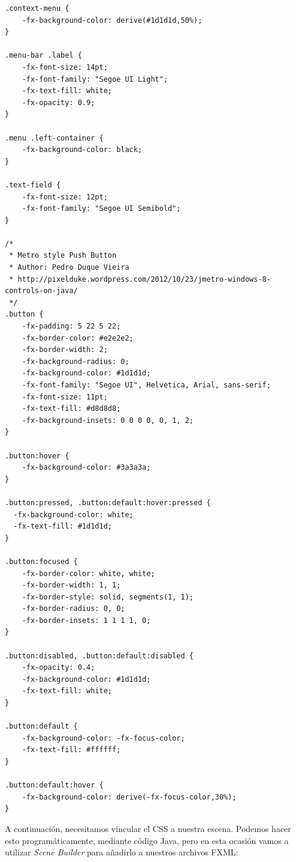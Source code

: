 \begin{verbatim}
.context-menu {
    -fx-background-color: derive(#1d1d1d,50%);
}

.menu-bar .label {
    -fx-font-size: 14pt;
    -fx-font-family: "Segoe UI Light";
    -fx-text-fill: white;
    -fx-opacity: 0.9;
}

.menu .left-container {
	-fx-background-color: black;
}

.text-field {
    -fx-font-size: 12pt;
    -fx-font-family: "Segoe UI Semibold";
}

/*
 * Metro style Push Button
 * Author: Pedro Duque Vieira
 * http://pixelduke.wordpress.com/2012/10/23/jmetro-windows-8-controls-on-java/
 */
.button {
    -fx-padding: 5 22 5 22;
    -fx-border-color: #e2e2e2;
    -fx-border-width: 2;
    -fx-background-radius: 0;
    -fx-background-color: #1d1d1d;
    -fx-font-family: "Segoe UI", Helvetica, Arial, sans-serif;
    -fx-font-size: 11pt;
    -fx-text-fill: #d8d8d8;
    -fx-background-insets: 0 0 0 0, 0, 1, 2;
}

.button:hover {
    -fx-background-color: #3a3a3a;
}

.button:pressed, .button:default:hover:pressed {
  -fx-background-color: white;
  -fx-text-fill: #1d1d1d;
}

.button:focused {
    -fx-border-color: white, white;
    -fx-border-width: 1, 1;
    -fx-border-style: solid, segments(1, 1);
    -fx-border-radius: 0, 0;
    -fx-border-insets: 1 1 1 1, 0;
}

.button:disabled, .button:default:disabled {
    -fx-opacity: 0.4;
    -fx-background-color: #1d1d1d;
    -fx-text-fill: white;
}

.button:default {
    -fx-background-color: -fx-focus-color;
    -fx-text-fill: #ffffff;
}

.button:default:hover {
    -fx-background-color: derive(-fx-focus-color,30%);
}
\end{verbatim}
A continuación, necesitamos vincular el CSS a nuestra escena. Podemos hacer esto programáticamente, 
mediante código Java, pero en esta ocasión vamos a utilizar \textit{Scene Builder} para añadirlo a 
nuestros archivos FXML:\\

